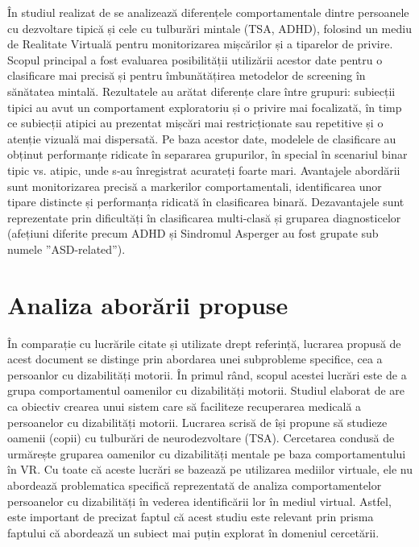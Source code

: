 \documentclass[12pt,a4paper]{report}
\theoremstyle{definition}
\theoremstyle{remark}
\begin{document}
În studiul realizat de \textcite{Vlasiu2024} se analizează diferențele comportamentale dintre persoanele cu dezvoltare tipică și cele cu tulburări mintale (TSA, ADHD), folosind un mediu de Realitate Virtuală pentru monitorizarea mișcărilor și a tiparelor de privire. Scopul principal a fost evaluarea posibilității utilizării acestor date pentru o clasificare mai precisă și pentru îmbunătățirea metodelor de screening în sănătatea mintală. Rezultatele au arătat diferențe clare între grupuri: subiecții tipici au avut un comportament exploratoriu și o privire mai focalizată, în timp ce subiecții atipici au prezentat mișcări mai restricționate sau repetitive și o atenție vizuală mai dispersată. Pe baza acestor date, modelele de clasificare au obținut performanțe ridicate în separarea grupurilor, în special în scenariul binar tipic vs. atipic, unde s-au înregistrat acurateți foarte mari. Avantajele abordării sunt monitorizarea precisă a markerilor comportamentali, identificarea unor tipare distincte și performanța ridicată în clasificarea binară. Dezavantajele sunt reprezentate prin dificultăți în clasificarea multi-clasă și gruparea diagnosticelor (afețiuni diferite precum ADHD și Sindromul Asperger au fost grupate sub numele ”ASD-related”).

\section{Analiza aborării propuse}

În comparație cu lucrările citate și utilizate drept referință, lucrarea propusă de acest document se distinge prin abordarea unei subprobleme specifice, cea a persoanlor cu dizabilități motorii. În primul rând, scopul acestei lucrări este de a grupa comportamentul oamenilor cu dizabilități motorii. Studiul elaborat de \textcite{Afdideh2025} are ca obiectiv crearea unui sistem care să faciliteze recuperarea medicală a persoanelor cu dizabilități motorii. Lucrarea scrisă de \textcite{AlcanizRaya2020} își propune să studieze oamenii (copii) cu tulburări de neurodezvoltare (TSA). Cercetarea condusă de \textcite{Vlasiu2024} urmărește gruparea oamenilor cu dizabilități mentale pe baza comportamentului în VR. Cu toate că aceste lucrări se bazează pe utilizarea mediilor virtuale, ele nu abordează problematica specifică reprezentată de analiza comportamentelor persoanelor cu dizabilități în vederea identificării lor în mediul virtual. Astfel, este important de precizat faptul că acest studiu este relevant prin prisma faptului că abordează un subiect mai puțin explorat în domeniul cercetării. 
\end{document}
